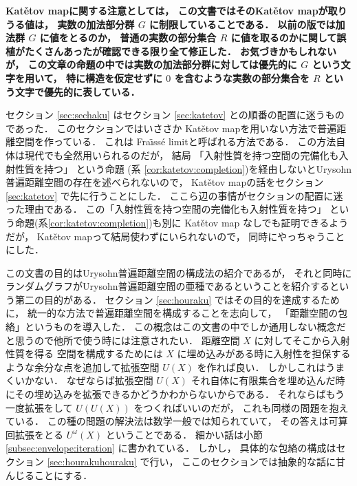 \documentclass[leqno, 12pt]{jsarticle}
\newcommand{\Ustage}[2]{U^{#1}(#2)}
\begin{document}
\textbf{Kat\v{e}tov mapに関する注意としては，%
この文書ではそのKat\v{e}tov mapが取りうる値は，%
実数の加法部分群%
$G$%
に制限していることである．%
以前の版では加法群%
$G$%
に値をとるのか，%
普通の実数の部分集合%
$R$%
に値を取るのかに関して誤植がたくさんあったが確認できる限り全て修正した．%
お気づきかもしれないが，%
この文章の命題の中では実数の加法部分群に対しては優先的に%
$G$%
という文字を用いて，%
特に構造を仮定せずに%
$0$%
を含むような実数の部分集合を%
$R$%
という文字で優先的に表している．%
}

セクション
\ref{sec:sechaku}
はセクション
\ref{sec:katetov}
との順番の配置に迷うものであった．%
このセクションではいささか
Kat\v{e}tov
mapを用いない方法で普遍距離空間を作っている．
これは
Fra\"{\i}ss\'{e} limitと呼ばれる方法である．
この方法自体は現代でも全然用いられるのだが，
結局
「入射性質を持つ空間の完備化も入射性質を持つ」
という命題
(系
\ref{cor:katetov:completion})を経由しないとUrysohn普遍距離空間の存在を述べられないので，
Kat\v{e}tov mapの話をセクション
\ref{sec:katetov}
で先に行うことにした．
ここら辺の事情がセクションの配置に迷った理由である．
この「入射性質を持つ空間の完備化も入射性質を持つ」
という命題(系\ref{cor:katetov:completion})も別に
Kat\v{e}tov map
なしでも証明できるようだが，
Kat\v{e}tov mapって結局使わずにいられないので，
同時にやっちゃうことにした．



この文書の目的はUrysohn普遍距離空間の構成法の紹介であるが，
それと同時にランダムグラフがUrysohn普遍距離空間の亜種であるということを紹介するという第二の目的がある．
セクション
\ref{sec:houraku}
ではその目的を達成するために，
統一的な方法で普遍距離空間を構成することを志向して，%
「距離空間の包絡」というものを導入した．
この概念はこの文書の中でしか通用しない概念だと思うので他所で使う時には注意されたい．
距離空間
$X$
に対してそこから入射性質を得る
空間を構成するためには
$X$
に埋め込みがある時に入射性を担保するような余分な点を追加して拡張空間
$U(X)$
を作れば良い．
しかしこれはうまくいかない．
なぜならば拡張空間
$U(X)$
それ自体に有限集合を埋め込んだ時にその埋め込みを拡張できるかどうかわからないからである．
それならばもう一度拡張をして
$U(U(X))$%
をつくればいいのだが，
これも同様の問題を抱えている．
この種の問題の解決法は数学一般では知られていて，
その答えは可算回拡張をとる
$\Ustage{\omega}{X}$
ということである．
細かい話は小節
\ref{subsec:envelope:iteration}
に書かれている．
しかし，%
具体的な包絡の構成はセクション
\ref{sec:hourakuhouraku}
で行い，%
ここのセクションでは抽象的な話に甘んじることにする．
\end{document}
